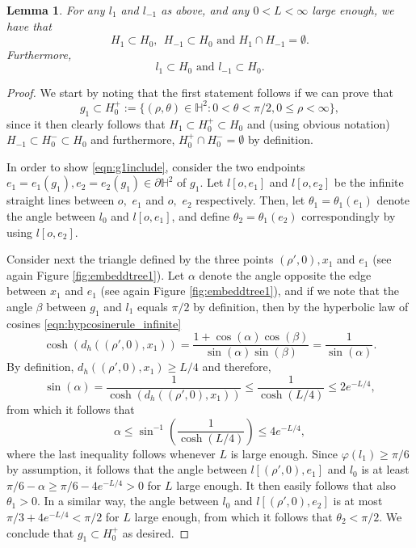 \documentclass[a4paper,12pt]{article}
\newcommand{\BH}{{\mathbb{H}}}
\newtheorem{lemma}[theorem]{Lemma}
\begin{document}
\begin{lemma} \label{lemma:half-planes}
For any $l_1$ and $l_{-1}$ as above, and any $0<L<\infty$ large enough, we have that 
\[
H_1 \subset H_0, \ \  H_{-1} \subset H_0 \textrm{ and } H_1 \cap H_{-1} =\emptyset.
\]
Furthermore, 
\[
l_1 \subset H_0 \textrm{ and } l_{-1} \subset H_{0}.
\]
\end{lemma}
\begin{proof}
We start by noting that the first statement follows if we can prove that 
\begin{equation} \label{eqn:g1include}
   g_1 \subset H_0^+:=\{(\rho,\theta)\in \BH^2: 0< \theta < \pi/2, 0\leq \rho<\infty\}, 
\end{equation}
since it then clearly follows that 
$H_1 \subset H_0^+ \subset H_0$ and (using obvious notation) 
$H_{-1} \subset H_0^{-} \subset H_0$ and furthermore, 
$H_0^+ \cap H_0^-=\emptyset$ by definition.

In order to show \eqref{eqn:g1include}, consider the two endpoints 
$e_1=e_1(g_1),e_2=e_2(g_1) \in \partial \BH^2$ of $g_1$. 
Let $l[o,e_1]$ and $l[o,e_2]$  be the infinite straight lines between 
$o,$ $e_1$ and $o,$ $e_2$ respectively.
Then, let $\theta_1=\theta_1(e_1)$ denote the angle between $l_0$
and $l[o,e_1]$, and define $\theta_2=\theta_1(e_2)$ correspondingly by using 
$l[o,e_2]$.


Consider next the triangle defined by the three points 
$(\rho',0),x_1$ and $e_1$ 
(see again Figure \ref{fig:embeddtree1}). 
Let $\alpha$ denote the angle opposite the edge between $x_1$ and $e_1$
(see again Figure \ref{fig:embeddtree1}),
and if we note that the angle $\beta$ between 
$g_1$ and $l_1$ equals $\pi/2$ by definition, then by the hyperbolic law of cosines 
\eqref{eqn:hypcosinerule_infinite}
\[
\cosh(d_h((\rho',0),x_1))=\frac{1+\cos(\alpha)\cos(\beta)}{\sin(\alpha)\sin(\beta)}
=\frac{1}{\sin(\alpha)}.
\]
By definition, $d_h((\rho',0),x_1)\geq L/4$ and therefore,
\[
\sin(\alpha)=\frac{1}{\cosh(d_h((\rho',0),x_1))}\leq \frac{1}{\cosh(L/4)}
\leq 2e^{-L/4},
\]
from which it follows that 
\[
\alpha  \leq \sin^{-1}\left(\frac{1}{\cosh(L/4)}\right)\leq 4e^{-L/4},
\]
where the last inequality follows whenever $L$ is large enough. 
Since $\varphi(l_1) \geq \pi/6$ by assumption, it follows that the angle between 
$l[(\rho',0),e_1]$ and $l_0$ is at least $\pi/6-\alpha\geq \pi/6-4e^{-L/4}>0$ 
for $L$ large enough. It then easily follows that also $\theta_1>0.$
In a similar way, the angle between $l_0$ and $l[(\rho',0),e_2]$ is at most
$\pi/3+4e^{-L/4}<\pi/2$ for $L$ large enough, from which it follows that 
$\theta_2< \pi/2.$ We conclude that $g_1 \subset H_0^+$ as desired. 






\end{proof}
\end{document}

